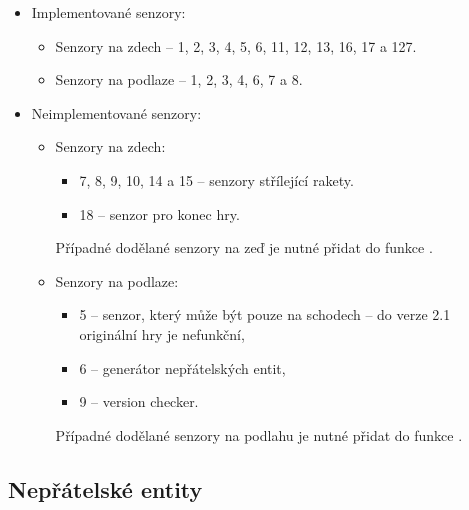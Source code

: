 \begin{itemize}
\item Implementované senzory:
	\begin{itemize}
	\item Senzory na zdech -- 1, 2, 3, 4, 5, 6, 11, 12, 13, 16, 17 a 127.  
	\item Senzory na podlaze -- 1, 2, 3, 4, 6, 7 a 8. 
	\end{itemize}

\item Neimplementované senzory:
	\begin{itemize}
	\item Senzory na zdech:
		\begin{itemize}
		\item 7, 8, 9, 10, 14 a 15 -- senzory střílející rakety.
		\item 18 -- senzor pro konec hry.
		\end{itemize}
		Případné dodělané senzory na zeď je nutné přidat do funkce .
	\item Senzory na podlaze:
		\begin{itemize}
		\item 5 -- senzor, který může být pouze na schodech -- do verze 2.1 originální hry je nefunkční,
		\item 6 -- generátor nepřátelských entit,
		\item 9 -- version checker. 
		\end{itemize}
		Případné dodělané senzory na podlahu je nutné přidat do funkce .
	\end{itemize}
\end{itemize}


\subsection{Nepřátelské entity}

